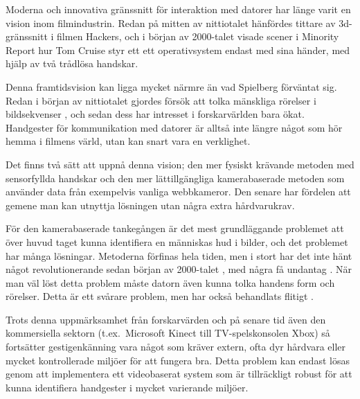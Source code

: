 \documentclass[../rapport_MVEX01-11-05]{subfiles}
\begin{document}
Moderna och innovativa gränssnitt för interaktion med datorer har länge varit
en vision inom filmindustrin. Redan på mitten av nittiotalet hänfördes
tittare av 3d-gränssnitt i filmen Hackers, och i början av 2000-talet visade
scener i Minority Report hur Tom Cruise styr ett ett operativsystem endast med
sina händer, med hjälp av två trådlösa handskar.

Denna framtidsvision kan
ligga mycket närmre än vad Spielberg förväntat sig. Redan i början av
nittiotalet gjordes försök att tolka mänskliga rörelser i bildsekvenser
\cite{Yamato92}, och sedan dess har intresset i forskarvärlden bara ökat.
Handgester för kommunikation med datorer är alltså inte längre något som
hör hemma i filmens värld, utan kan snart vara en verklighet.

Det finns två sätt att uppnå denna vision; den mer fysiskt krävande
metoden med sensorfyllda handskar och den mer lättillgängliga kamerabaserade
metoden som använder data från exempelvis vanliga webbkameror. Den senare har
fördelen att gemene man kan utnyttja lösningen utan några extra hårdvarukrav.

För den kamerabaserade tankegången är det mest grundläggande problemet att över huvud taget kunna identifiera en människas hud i bilder, och det
problemet har många lösningar. Metoderna förfinas hela tiden, men i stort har
det inte hänt något revolutionerande sedan början av 2000-talet
\cite{Sebe04,Kruppa02,Albiol01,Brand00}, med några få undantag
. När man väl löst detta problem måste datorn
även kunna tolka handens form och rörelser. Detta är ett svårare problem, men
har också behandlats flitigt \cite{Pavlovic97,Garg09,Nielsen04,Zabulis09}.

%

Trots denna uppmärksamhet från forskarvärden och på senare tid även den kommersiella sektorn
 (t.ex.~Microsoft Kinect till TV-spelskonsolen Xbox) så fortsätter gestigenkänning vara något som
kräver extern, ofta dyr hårdvara eller mycket kontrollerade miljöer för att
fungera bra. Detta problem kan endast lösas genom att implementera ett
videobaserat system som är tillräckligt robust för att kunna identifiera
handgester i mycket varierande miljöer.
\end{document}
